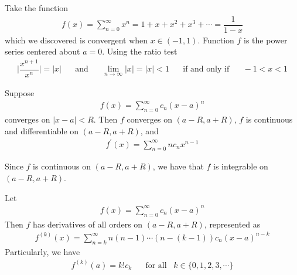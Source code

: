 \begin{example}
Take the function
\begin{align*}
    f(x) = \sum_{n=0}^{\infty} x^{n} = 1 + x + x^{2} + x^{3} + \cdots = \dfrac{1}{1-x}
\end{align*}
which we discovered is convergent when $x \in (-1, 1)$. Function $f$ is the power series centered about $a=0$. Using the ratio test
\begin{align*}
    \Big\lvert \dfrac{x^{n+1}}{x^{n}} \Big\rvert = \lvert x \rvert \hspace{20pt} \text{and} \hspace{20pt} \lim_{n \longrightarrow \infty} \lvert x \rvert = \lvert x \rvert < 1 \hspace{20pt} \text{if and only if} \hspace{20pt} -1 < x < 1
\end{align*}
\end{example}

\begin{theorem}
Suppose
\begin{align*}
    f(x) = \sum_{n=0}^{\infty} c_{n} (x-a)^{n}
\end{align*}
converges on $\lvert x - a \rvert < R$. Then $f$ converges on $(a-R, a+R)$, $f$ is continuous and differentiable on $(a-R, a+R)$, and 
\begin{align*}
    f^{'}(x) = \sum_{n=0}^{\infty} n c_{n} x^{n-1}
\end{align*}
\end{theorem}

Since $f$ is continuous on $(a-R, a+R)$, we have that $f$ is integrable on $(a-R, a+R)$.

\begin{theorem}
Let
\begin{align*}
    f(x) = \sum_{n=0}^{\infty} c_{n} (x-a)^{n}
\end{align*}
Then $f$ has derivatives of all orders on $(a-R, a+R)$, represented as 
\begin{align*}
    f^{(k)}(x) = \sum_{n=k}^{\infty} n(n-1) \cdots (n-(k-1)) c_{n} (x-a)^{n-k}
\end{align*}
Particularly, we have
\begin{align*}
    f^{(k)}(a) = k!c_{k} \hspace{20pt} \text{for all} \hspace{10pt} k \in \{0, 1, 2, 3, \cdots \}
\end{align*}
\end{theorem}


